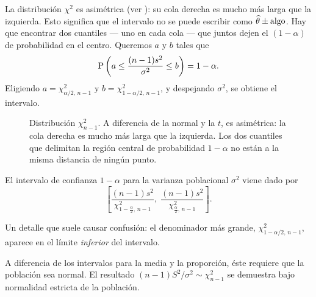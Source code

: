 La distribución \(\chi^2\) es asimétrica (ver ): su cola derecha es mucho más larga que la izquierda. Esto significa que el intervalo no se puede escribir como \(\widehat{\theta} \pm \text{algo}\). Hay que encontrar dos cuantiles — uno en cada cola — que juntos dejen el \((1-\alpha)\) de probabilidad en el centro. Queremos \(a\) y \(b\) tales que \[\operatorname{P}\left(a \leq \frac{(n-1)s^2}{\sigma^2} \leq b\right) = 1-\alpha.\] Eligiendo \(a = \chi^2_{\alpha/2,\,n-1}\) y \(b = \chi^2_{1-\alpha/2,\,n-1}\), y despejando \(\sigma^2\), se obtiene el intervalo.

\begin{figure}
\caption{Distribución \(\chi^2_{n-1}\). A diferencia de la normal y la \(t\), es asimétrica: la cola derecha es mucho más larga que la izquierda. Los dos cuantiles que delimitan la región central de probabilidad \(1-\alpha\) no están a la misma distancia de ningún punto.}
\end{figure}

\begin{definition}
El intervalo de confianza \(1-\alpha\) para la varianza poblacional \(\sigma^2\) viene dado por \[\left[\frac{(n-1)s^2}{\chi^2_{1-\frac{\alpha}{2},\,n-1}},\;\frac{(n-1)s^2}{\chi^2_{\frac{\alpha}{2},\,n-1}}\right].\]
\end{definition}

Un detalle que suele causar confusión: el denominador más grande, \(\chi^2_{1-\alpha/2,\,n-1}\), aparece en el límite \emph{inferior} del intervalo.

A diferencia de los intervalos para la media y la proporción, éste requiere que la población sea normal. El resultado \((n-1)S^2/\sigma^2 \sim \chi^2_{n-1}\) se demuestra bajo normalidad estricta de la población.

